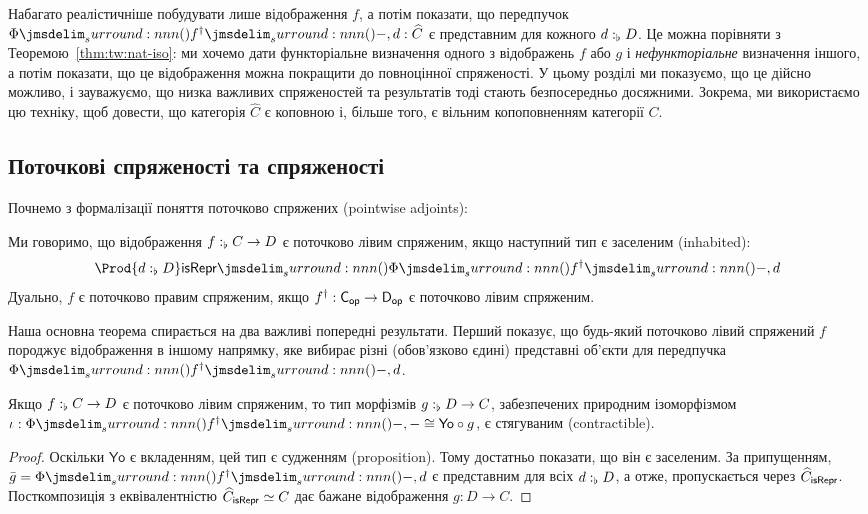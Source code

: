 \documentclass[12pt]{article}
\newcommand{\PSH}[1]{\widehat{#1}}
\newcommand{\Yo}{\mathsf{Yo}}
\newcommand{\Equiv}{\mathrel{\simeq}}
\newcommand{\GM}{\flat}
\newcommand{\OM}{\mathsf{op}}
\let\prn\DelimPrn
\begin{document}
Набагато реалістичніше побудувати лише відображення $f$, а потім показати, що передпучок $\Phi\prn{f^\dagger\prn{-},d} : \PSH{C}$ є представним для кожного $\DeclVar{d}{\GM}{D}$. Це можна порівняти з Теоремою~\ref{thm:tw:nat-iso}: ми хочемо дати функторіальне визначення одного з відображень $f$ або $g$ і \emph{нефункторіальне} визначення іншого, а потім показати, що це відображення можна покращити до повноцінної спряженості. У цьому розділі ми показуємо, що це дійсно можливо, і зауважуємо, що низка важливих спряженостей та результатів тоді стають безпосередньо досяжними. Зокрема, ми використаємо цю техніку, щоб довести, що категорія $\PSH{C}$ є коповною і, більше того, є вільним копоповненням категорії $C$.

\subsection{Поточкові спряженості та спряженості}
\label{sec:adj:pw}

Почнемо з формалізації поняття поточково спряжених (pointwise adjoints):
\begin{defi}
  Ми говоримо, що відображення $\DeclVar{f}{\GM}{C \to D}$ є поточково лівим спряженим, якщо наступний тип є заселеним (inhabited):
  \[
    \Prod{\DeclVar{d}{\GM}{D}} \Con{isRepr}\prn{\Phi\prn{f^\dagger\prn{-}, d}}
  \]
  Дуально, $f$ є поточково правим спряженим, якщо $f^\dagger : \Modify[\OM]{C} \to \Modify[\OM]{D}$ є поточково лівим спряженим.
\end{defi}

Наша основна теорема спирається на два важливі попередні результати. Перший показує, що будь-який поточково лівий спряжений $f$ породжує відображення в іншому напрямку, яке вибирає різні (обов'язково єдині) представні об'єкти для передпучка $\Phi\prn{f^\dagger\prn{-}, d}$.
\begin{lem}
  Якщо $\DeclVar{f}{\GM}{C \to D}$ є поточково лівим спряженим, то тип морфізмів $\DeclVar{g}{\GM}{D \to C}$, забезпечених природним ізоморфізмом $\iota : \Phi\prn{f^\dagger\prn{-}, -} \cong \Yo \circ g$, є стягуваним (contractible).
\end{lem}
\begin{proof}
  Оскільки $\Yo$ є вкладенням, цей тип є судженням (proposition). Тому достатньо показати, що він є заселеним. За припущенням, $\bar{g} = \Phi\prn{f^\dagger\prn{-}, d}$ є представним для всіх $\DeclVar{d}{\GM}{D}$, а отже, пропускається через $\PSH{C}_{\Con{isRepr}}$. Посткомпозиція з еквівалентністю $\PSH{C}_{\Con{isRepr}} \Equiv C$ дає бажане відображення $g : D \to C$.
\end{proof}
\end{document}
